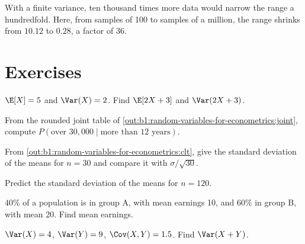 \label{out:b1:random-variables-for-econometrics:heavy}

With a finite variance, ten thousand times more data would narrow the
range a hundredfold. Here, from samples of 100 to samples of a million, the
range shrinks from $10.12$ to $0.28$, a factor of 36. %

\section*{Exercises}\label{sec:b1:random-variables-for-econometrics:exercises}

\begin{exercise}[$\star$]\label{exo:b1:random-variables-for-econometrics:linear}
$\E[X] = 5$ and $\Var(X) = 2$. Find $\E[2X + 3]$ and $\Var(2X + 3)$.
\end{exercise}

\begin{exercise}[$\star$]\label{exo:b1:random-variables-for-econometrics:cond}
From the rounded joint table of \cref{out:b1:random-variables-for-econometrics:joint}, compute
$P(\text{over } 30{,}000 \mid \text{more than 12 years})$.
\end{exercise}

\begin{exercise}[$\star$]\label{exo:b1:random-variables-for-econometrics:read}
From \cref{out:b1:random-variables-for-econometrics:clt}, give the standard deviation of the
means for $n = 30$ and compare it with $\sigma/\sqrt{30}$.
\end{exercise}

\begin{exercise}[$\star$]\label{exo:b1:random-variables-for-econometrics:predict}
Predict the standard deviation of the means for $n = 120$.
\end{exercise}

\begin{exercise}[$\star\star$]\label{exo:b1:random-variables-for-econometrics:two-groups}
$40\%$ of a population is in group A, with mean earnings 10, and $60\%$ in group B,
with mean 20. Find mean earnings.
\end{exercise}

\begin{exercise}[$\star\star$]\label{exo:b1:random-variables-for-econometrics:var-sum}
$\Var(X) = 4$, $\Var(Y) = 9$, $\Cov(X, Y) = 1.5$. Find $\Var(X + Y)$.
\end{exercise}

